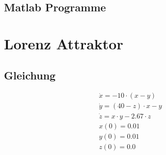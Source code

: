 \documentclass[10pt]{scrartcl}
\begin{document}
	\subsection{Matlab Programme}
	
	
		
		\section{Lorenz Attraktor}
		\subsection{Gleichung}
			\begin{align}
				&\dot{x}=-10 \cdot (x-y)\\
				&\dot{y}=(40-z)\cdot x-y\\
				&\dot{z}=x \cdot y - 2.67 \cdot z\\
				&x(0)=0.01\\
				&y(0)=0.01\\
				&z(0)=0.0
			\end{align}
\end{document}
